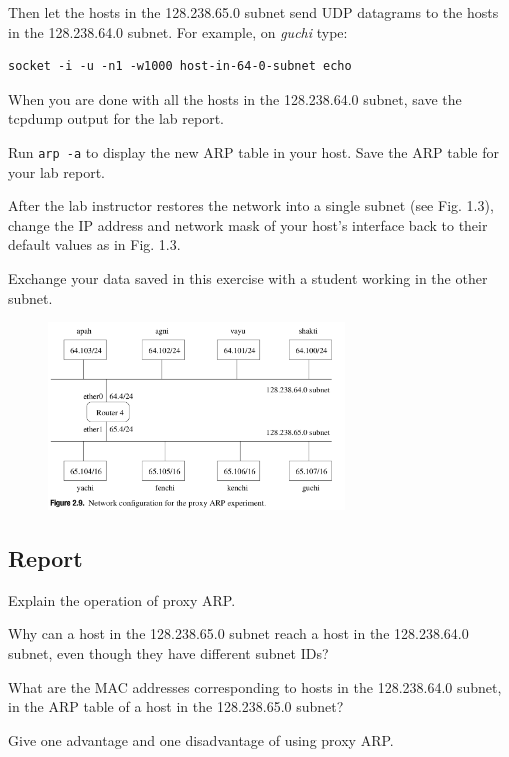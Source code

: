 \documentclass{../UTNetLab}
\begin{document}
    Then let the hosts in the 128.238.65.0 subnet send UDP datagrams to the hosts in the 128.238.64.0 subnet.
    For example, on \textit{guchi} type:
    \begin{lstlisting}[emph={host-in-64-0-subnet}]
socket -i -u -n1 -w1000 host-in-64-0-subnet echo
    \end{lstlisting}

    When you are done with all the hosts in the 128.238.64.0 subnet, save the tcpdump output for the lab report.

    Run \lstinline{arp -a} to display the new ARP table in your host.
    Save the ARP table for your lab report.

    After the lab instructor restores the network into a single subnet (see Fig. 1.3), change the IP address and network mask of your host’s interface back to their default values as in Fig. 1.3.

    Exchange your data saved in this exercise with a student working in the other subnet.

    \begin{figure}[H]
        \centering
        \includegraphics[width=0.7\textwidth]{img/figure2-9.png}
    \end{figure}
    
    \subsection*{Report}
    Explain the operation of proxy ARP.

    Why can a host in the 128.238.65.0 subnet reach a host in the 128.238.64.0 subnet, even though they have different subnet IDs?

    What are the MAC addresses corresponding to hosts in the 128.238.64.0 subnet, in the ARP table of a host in the 128.238.65.0 subnet?

    Give one advantage and one disadvantage of using proxy ARP.
\end{document}
